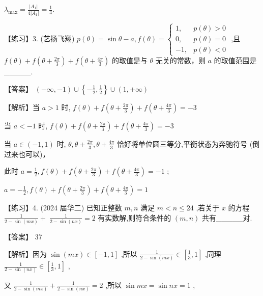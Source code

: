 \documentclass[10pt]{article}
\begin{document}
\({\lambda }_{\max } = \frac{\left| {A}_{1}\right| }{4\left| {A}_{1}\right| } = \frac{1}{4}.\)

【练习】3. (艺扬飞翔) \(p\left( \theta \right)  = \sin \theta  - a,f\left( \theta \right)  = \left\{  \begin{array}{ll} 1, & p\left( \theta \right)  > 0 \\  0, & p\left( \theta \right)  = 0 \\   - 1, & p\left( \theta \right)  < 0 \end{array}\right.\) ,且 \(f\left( \theta \right)  + f\left( {\theta  + \frac{2\pi }{3}}\right)  + f\left( {\theta  + \frac{4\pi }{3}}\right)\) 的取值是与 \(\theta\) 无关的常数，则 \(a\) 的取值范围是\_\_\_\_\_.

【答案】 \(\left( {-\infty , - 1}\right)  \cup  \left\{  {-\frac{1}{2},\frac{1}{2}}\right\}   \cup  \left( {1, + \infty }\right)\)

【解析】当 \(a > 1\) 时, \(f\left( \theta \right)  + f\left( {\theta  + \frac{2\pi }{3}}\right)  + f\left( {\theta  + \frac{4\pi }{3}}\right)  =  - 3\)

当 \(a <  - 1\) 时, \(f\left( \theta \right)  + f\left( {\theta  + \frac{2\pi }{3}}\right)  + f\left( {\theta  + \frac{4\pi }{3}}\right)  =  - 3\)

当 \(a \in  \left( {-1,1}\right)\) 时, \(\theta ,\theta  + \frac{2\pi }{3},\theta  + \frac{4\pi }{3}\) 恰好将单位圆三等分,平衡状态为奔驰符号 (倒过来也可以)，

此时 \(a = \frac{1}{2},f\left( \theta \right)  + f\left( {\theta  + \frac{2\pi }{3}}\right)  + f\left( {\theta  + \frac{4\pi }{3}}\right)  =  - 1\) ;

\(a =  - \frac{1}{2},f\left( \theta \right)  + f\left( {\theta  + \frac{2\pi }{3}}\right)  + f\left( {\theta  + \frac{4\pi }{3}}\right)  = 1\)

【练习】4. (2024 届华二) 已知正整数 \(m,n\) 满足 \(m < n \leq  {24}\) ,若关于 \(x\) 的方程 \(\frac{1}{2 - \sin \left( {mx}\right) } + \; \frac{1}{2 - \sin \left( {nx}\right) } = 2\) 有实数解,则符合条件的 \(\left( {m,n}\right)\) 共有\_\_\_\_\_对.

【答案】 37

【解析】因为 \(\sin \left( {mx}\right)  \in  \left\lbrack  {-1,1}\right\rbrack\) ,所以 \(\frac{1}{2 - \sin \left( {mx}\right) } \in  \left\lbrack  {\frac{1}{3},1}\right\rbrack\) ,同理 \(\frac{1}{2 - \sin \left( {nx}\right) } \in  \left\lbrack  {\frac{1}{3},1}\right\rbrack\) ,

又 \(\frac{1}{2 - \sin \left( {mx}\right) } + \frac{1}{2 - \sin \left( {nx}\right) } = 2\) ,所以 \(\sin {mx} = \sin {nx} = 1\) ,
\end{document}
